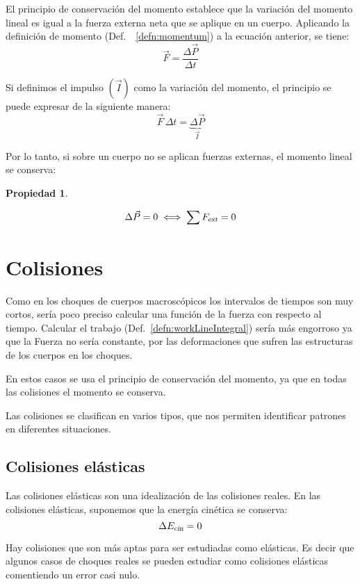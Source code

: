 \documentclass[a5paper,12pt,twoside]{book}
\newtheorem{prop}{{Propiedad}}[chapter]
\begin{document}
El principio de conservación del momento establece que la variación del momento lineal es igual a la fuerza externa neta que se aplique en un cuerpo. Aplicando la definición de momento (Def.\ ~\ref{defn:momentum}) a la ecuación anterior, se tiene:
\[ \Vec{F} = \frac{\Delta \Vec{P}}{\Delta t} \]

Si definimos el impulso $(\Vec{I})$ como la variación del momento, el principio se puede expresar de la siguiente manera:
\[ \Vec{F} \, \Delta t = \underbrace{\Delta \Vec{P}}_{\Vec{I}} \]

Por lo tanto, si sobre un cuerpo no se aplican fuerzas externas, el momento lineal se conserva:

\begin{mdframed}[style=MyFrame1]
    \begin{prop}
    \end{prop}
    \begin{equation*}
        \Delta \Vec{P} = 0 \iff \sum {{F}_\textsl{{ext}}} = 0
    \end{equation*}
\end{mdframed}


\section{Colisiones}

Como en los choques de cuerpos macroscópicos los intervalos de tiempos son muy cortos, sería poco preciso calcular una función de la fuerza con respecto al tiempo. Calcular el trabajo (Def.\ \ref{defn:workLineIntegral}) sería más engorroso ya que la Fuerza no sería constante, por las deformaciones que sufren las estructuras de los cuerpos en los choques.

En estos casos se usa el principio de conservación del momento, ya que en todas las colisiones el momento se conserva.

Las colisiones se clasifican en varios tipos, que nos permiten identificar patrones en diferentes situaciones.


\subsection{Colisiones elásticas}

Las colisiones elásticas son una idealización de las colisiones reales. En las colisiones elásticas, suponemos que la energía cinética se conserva:
\[ \Delta {{E}_\textsl{{cin}}} = 0 \]

Hay colisiones que son más aptas para ser estudiadas como elásticas. Es decir que algunos casos de choques reales se pueden estudiar como colisiones elásticas comentiendo un error casi nulo.
\end{document}
